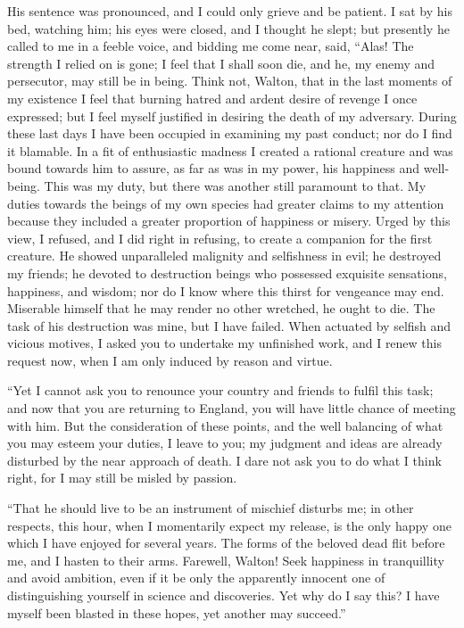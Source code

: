 \documentclass[12pt,openright]{book}
\begin{document}
His sentence was pronounced, and I could only grieve and be patient. I sat by his bed, watching him; his eyes were closed, and I thought he slept; but presently he called to me in a feeble voice, and bidding me come near, said, “Alas! The strength I relied on is gone; I feel that I shall soon die, and he, my enemy and persecutor, may still be in being. Think not, Walton, that in the last moments of my existence I feel that burning hatred and ardent desire of revenge I once expressed; but I feel myself justified in desiring the death of my adversary. During these last days I have been occupied in examining my past conduct; nor do I find it blamable. In a fit of enthusiastic madness I created a rational creature and was bound towards him to assure, as far as was in my power, his happiness and well-being. This was my duty, but there was another still paramount to that. My duties towards the beings of my own species had greater claims to my attention because they included a greater proportion of happiness or misery. Urged by this view, I refused, and I did right in refusing, to create a companion for the first creature. He showed unparalleled malignity and selfishness in evil; he destroyed my friends; he devoted to destruction beings who possessed exquisite sensations, happiness, and wisdom; nor do I know where this thirst for vengeance may end. Miserable himself that he may render no other wretched, he ought to die. The task of his destruction was mine, but I have failed. When actuated by selfish and vicious motives, I asked you to undertake my unfinished work, and I renew this request now, when I am only induced by reason and virtue.

“Yet I cannot ask you to renounce your country and friends to fulfil this task; and now that you are returning to England, you will have little chance of meeting with him. But the consideration of these points, and the well balancing of what you may esteem your duties, I leave to you; my judgment and ideas are already disturbed by the near approach of death. I dare not ask you to do what I think right, for I may still be misled by passion.

“That he should live to be an instrument of mischief disturbs me; in other respects, this hour, when I momentarily expect my release, is the only happy one which I have enjoyed for several years. The forms of the beloved dead flit before me, and I hasten to their arms. Farewell, Walton! Seek happiness in tranquillity and avoid ambition, even if it be only the apparently innocent one of distinguishing yourself in science and discoveries. Yet why do I say this? I have myself been blasted in these hopes, yet another may succeed.”
\end{document}

